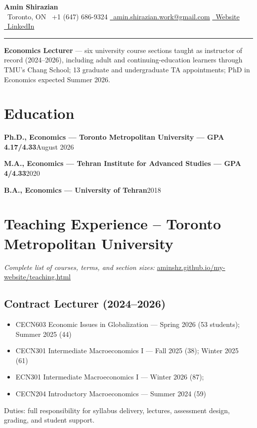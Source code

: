 \documentclass[10.5pt]{article}
\makeatletter
\newcommand{\headingfont}{\sffamily}
\newcommand{\nameblock}{%
	{\headingfont\LARGE\bfseries Amin Shirazian}\\[2pt]
	\faMapMarker*\ Toronto, ON \;\textbar\; \faPhone\ +1 (647) 686-9324 \;\textbar\; \href{mailto:amin.shirazian.work@gmail.com}{\faEnvelope\ amin.shirazian.work@gmail.com} \;\textbar\; \href{https://aminshz.github.io/my-website/}{\faGlobe\ Website} \;\textbar\; \href{https://linkedin.com/in/amin-shirazian}{\faLinkedin\ LinkedIn}\\[-4pt]
	\rule{\textwidth}{1pt}}
\newcommand{\entry}[2]{%
  \textbf{#1}\hfill{#2}\par\vspace{2pt}%
}
\makeatother
\begin{document}
	
	\nameblock
	
	\vspace{2pt}
	{\headingfont\bfseries Economics Lecturer} --- six university course sections taught as instructor of record (2024--2026), including adult and continuing-education learners through TMU's Chang School; 13 graduate and undergraduate TA appointments; PhD in Economics expected Summer 2026.
	
	\section{Education}

	\entry{Ph.D., Economics --- Toronto Metropolitan University --- GPA 4.17/4.33}{August 2026}
	
	\vspace{4pt}
	\entry{M.A., Economics --- Tehran Institute for Advanced Studies --- GPA 4/4.33}{2020}
	\entry{B.A., Economics --- University of Tehran}{2018}
	

	\section{Teaching Experience -- Toronto Metropolitan University}
	\textit{Complete list of courses, terms, and section sizes:} \href{https://aminshz.github.io/my-website/teaching.html}{aminshz.github.io/my-website/teaching.html}

	\subsection*{Contract Lecturer (2024--2026)}
	
	\begin{itemize}[leftmargin=*, itemsep=1pt, topsep=2pt]
		\item CECN603 Economic Issues in Globalization --- Spring 2026 (53 students); Summer 2025 (44)
		\item CECN301 Intermediate Macroeconomics I --- Fall 2025 (38); Winter 2025 (61)
		\item ECN301 Intermediate Macroeconomics I ---  Winter 2026 (87); 
		\item CECN204 Introductory Macroeconomics --- Summer 2024 (59)

	\end{itemize}

	Duties: full responsibility for syllabus delivery, lectures, assessment design, grading, and student support. 
\end{document}
